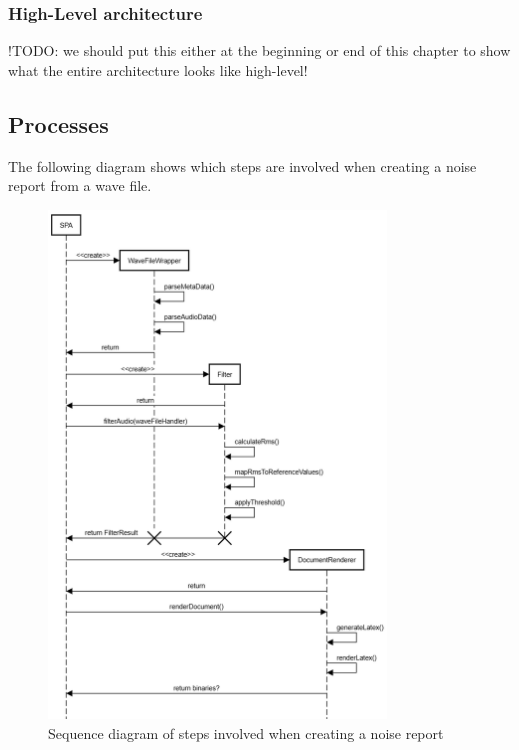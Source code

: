 \subsubsection{High-Level architecture}
!TODO: we should put this either at the beginning or end of this chapter to show what the entire architecture looks like high-level!

\subsection{Processes}
The following diagram shows which steps are involved when creating a noise report from a wave file.

\begin{figure}[H]
    \centering
    \includegraphics[width=0.8\textwidth]{../assets/sequence_diagram_from_wave_file_to_pdf.png}
    \caption{Sequence diagram of steps involved when creating a noise report}
\end{figure}

